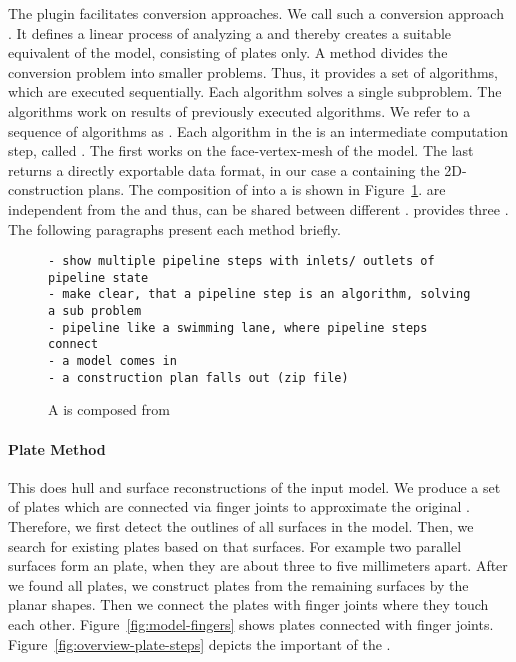 \documentclass[../03-Architecture.tex]{subfiles}
\begin{document}
The  plugin facilitates conversion
approaches. We call such a conversion approach
\class{\fabmethod}.
It defines a linear process of analyzing a {\threedmodel}
and thereby creates a suitable equivalent of the model,
consisting of plates only. A \class{\fabrication} method
divides the conversion problem into smaller problems. Thus,
it provides a set of algorithms, which are executed
sequentially. Each algorithm solves a single subproblem. The
algorithms work on results of previously executed
algorithms. We refer to a sequence of algorithms as
. Each algorithm in the  is
an intermediate computation step, called
. The first  works
on the face-vertex-mesh of the model. The last
 returns a directly exportable data
format, in our case a {\zipfile} containing the
2D-construction plans. The composition of
 into a  is shown in
Figure~\ref{fig:pipeline-from-steps}. 
are independent from the \class{\fabmethod} and thus, can be
shared between different . {\platener}
provides three . The following paragraphs
present each method briefly.

\begin{figure}[h]
\centering
\begin{verbatim}
- show multiple pipeline steps with inlets/ outlets of
pipeline state
- make clear, that a pipeline step is an algorithm, solving
a sub problem
- pipeline like a swimming lane, where pipeline steps
connect
- a model comes in
- a construction plan falls out (zip file)
\end{verbatim}
\caption{A  is composed from
  }
\label{fig:pipeline-from-steps}
\end{figure}

\paragraph{Plate Method}

This \class{\fabmethod} does hull and surface
reconstructions of the input model. We produce a set of
plates which are connected via finger joints to approximate
the original {\threedmodel}. Therefore, we first detect the
outlines of all surfaces in the model. Then, we search for
existing plates based on that surfaces. For example two
parallel surfaces form an  plate, when they
are about three to five millimeters apart. After we found
all  plates, we construct plates from the
remaining surfaces by  the planar shapes.
Then we connect the plates with finger joints where they
touch each other. Figure~\ref{fig:model-fingers} shows
plates connected with finger joints.
Figure~\ref{fig:overview-plate-steps} depicts the important
 of the .
\end{document}
